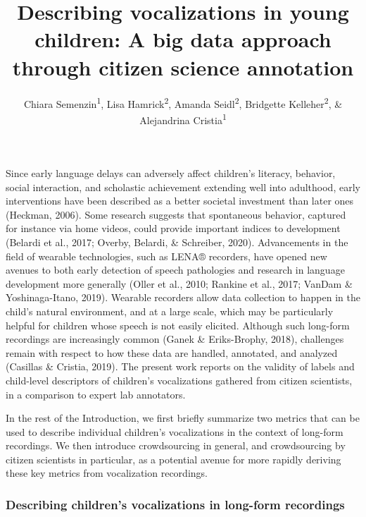 \documentclass[english,,man]{apa6}
\author{Chiara Semenzin\textsuperscript{1}, Lisa Hamrick\textsuperscript{2}, Amanda Seidl\textsuperscript{2}, Bridgette Kelleher\textsuperscript{2}, \& Alejandrina Cristia\textsuperscript{1}}
\affiliation{
\vspace{0.5cm}
\textsuperscript{1} Laboratoire de Sciences Cognitives et de Psycholinguistique, Département d'Etudes cognitives, ENS, EHESS, CNRS, PSL University\\\textsuperscript{2} Purdue University}
\title{Describing vocalizations in young children: A big data approach through citizen science annotation}
\date{}
\begin{document}
\maketitle

Since early language delays can adversely affect children's literacy, behavior, social interaction, and scholastic achievement extending well into adulthood, early interventions have been described as a better societal investment than later ones (Heckman, 2006). Some research suggests that spontaneous behavior, captured for instance via home videos, could provide important indices to development (Belardi et al., 2017; Overby, Belardi, \& Schreiber, 2020). Advancements in the field of wearable technologies, such as LENA® recorders, have opened new avenues to both early detection of speech pathologies and research in language development more generally (Oller et al., 2010; Rankine et al., 2017; VanDam \& Yoshinaga-Itano, 2019). Wearable recorders allow data collection to happen in the child's natural environment, and at a large scale, which may be particularly helpful for children whose speech is not easily elicited. Although such long-form recordings are increasingly common (Ganek \& Eriks-Brophy, 2018), challenges remain with respect to how these data are handled, annotated, and analyzed (Casillas \& Cristia, 2019). The present work reports on the validity of labels and child-level descriptors of children's vocalizations gathered from citizen scientists, in a comparison to expert lab annotators.

In the rest of the Introduction, we first briefly summarize two metrics that can be used to describe individual children's vocalizations in the context of long-form recordings. We then introduce crowdsourcing in general, and crowdsourcing by citizen scientists in particular, as a potential avenue for more rapidly deriving these key metrics from vocalization recordings.

\hypertarget{describing-childrens-vocalizations-in-long-form-recordings}{%
\subsubsection{Describing children's vocalizations in long-form recordings}\label{describing-childrens-vocalizations-in-long-form-recordings}}
\end{document}
